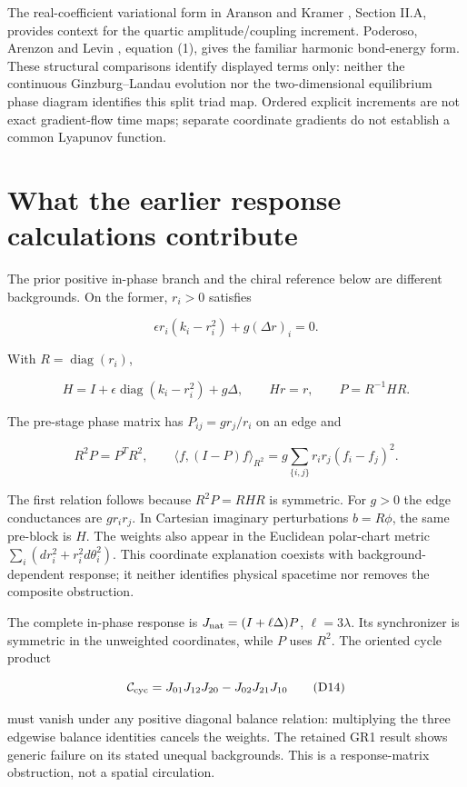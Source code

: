 \documentclass[11pt,a4paper]{article}
\begin{document}
The real-coefficient variational form in Aranson and Kramer \cite{AK}, Section II.A, provides context for the quartic amplitude/coupling increment. Poderoso, Arenzon and Levin \cite{PAL}, equation (1), gives the familiar harmonic bond-energy form. These structural comparisons identify displayed terms only: neither the continuous Ginzburg--Landau evolution nor the two-dimensional equilibrium phase diagram identifies this split triad map. Ordered explicit increments are not exact gradient-flow time maps; separate coordinate gradients do not establish a common Lyapunov function.

\section{What the earlier response calculations contribute}

The prior positive in-phase branch and the chiral reference below are different backgrounds. On the former, \(r_i>0\) satisfies

\[
\epsilon r_i(k_i-r_i^2)+g(\Delta r)_i=0.
\]

With \(R=\operatorname{diag}(r_i)\),

\[
H=I+\epsilon\operatorname{diag}(k_i-r_i^2)+g\Delta,\qquad Hr=r,
\qquad P=R^{-1}HR.
\tag{D12}\label{eq:D12}
\]

The pre-stage phase matrix has \(P_{ij}=g r_j/r_i\) on an edge and

\[
R^2P=P^TR^2,\qquad
\langle f,(I-P)f\rangle_{R^2}
=g\sum_{\{i,j\}}r_ir_j(f_i-f_j)^2.
\tag{D13}\label{eq:D13}
\]

The first relation follows because \(R^2P=RHR\) is symmetric. For \(g>0\) the edge conductances are \(g r_i r_j\). In Cartesian imaginary perturbations \(b=R\phi\), the same pre-block is \(H\). The weights also appear in the Euclidean polar-chart metric \(\sum_i(dr_i^2+r_i^2d\theta_i^2)\). This coordinate explanation coexists with background-dependent response; it neither identifies physical spacetime nor removes the composite obstruction.

The complete in-phase response is \(J_{\rm nat}=(I+\ell\Delta)P\), \(\ell=3\lambda\). Its synchronizer is symmetric in the unweighted coordinates, while \(P\) uses \(R^2\). The oriented cycle product

\[
\mathcal C_{\rm cyc}=J_{01}J_{12}J_{20}-J_{02}J_{21}J_{10}
\tag{D14}\label{eq:D14}
\]

must vanish under any positive diagonal balance relation: multiplying the three edgewise balance identities cancels the weights. The retained GR1 result shows generic failure on its stated unequal backgrounds. This is a response-matrix obstruction, not a spatial circulation.
\end{document}
